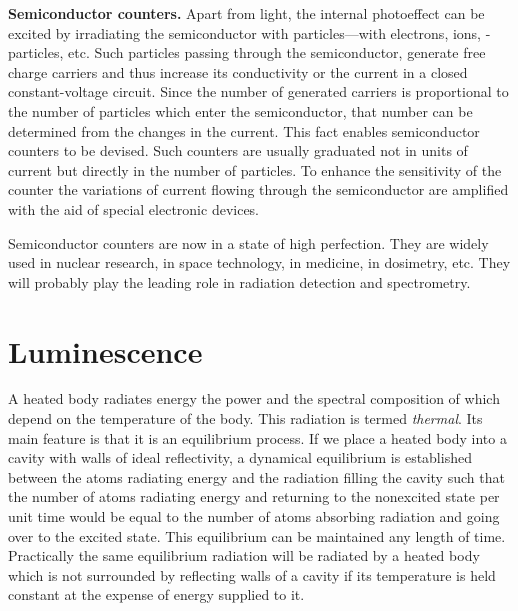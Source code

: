 \textbf{Semiconductor counters.} Apart from light, the internal photoeffect can be excited by irradiating the semiconductor with particles---with electrons, ions, \ce{\alpha}-particles, etc. Such particles passing through the semiconductor, generate free charge carriers and thus increase its conductivity or the current in a closed constant-voltage circuit. Since the number of generated carriers is proportional to the number of particles which enter the semiconductor, that number can be determined from the changes in the current. This fact enables semiconductor counters to be devised. Such counters are usually graduated not in units of current but directly in the number of particles. To enhance the sensitivity of the counter the variations of current flowing through the semiconductor are amplified with the aid of special electronic devices.

Semiconductor counters are now in a state of high perfection. They are widely used in nuclear research, in space technology, in medicine, in dosimetry, etc. They will probably play the leading role in radiation detection and spectrometry.

\section{Luminescence}\label{sec:61}

A heated body radiates energy the power and the spectral composition of which depend on the temperature of the body. This radiation is termed \textit{thermal}. Its main feature is that it is an equilibrium process. If we place a heated body into a cavity with walls of ideal reflectivity, a dynamical equilibrium is established between the atoms radiating energy and the radiation filling the cavity such that the number of atoms radiating energy and returning to the nonexcited state per unit time would be equal to the number of atoms absorbing radiation and going over to the excited state. This equilibrium can be maintained any length of time. Practically the same equilibrium radiation will be radiated by a heated body which is not surrounded by reflecting walls of a cavity if its temperature is held constant at the expense of energy supplied to it.

